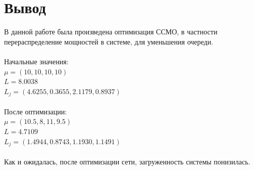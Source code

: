 \section{Вывод}
В данной работе была произведена оптимизация ССМО, в частности перераспределение мощностей в системе, для уменьшения очереди.\\\\
Начальные значения:\\
$\mu = (10, 10,10, 10)$\\
$L = 8.0038$\\
$L_j= (4.6255, 0.3655, 2.1179, 0.8937)$\\\\
После оптимизации:\\
$\mu = (10.5, 8, 11, 9.5)$\\
$L = 4.7109$\\
$L_j= (1.4944, 0.8743, 1.1930, 1.1491)$\\\\
Как и ожидалась, после оптимизации сети, загруженность системы понизилась.